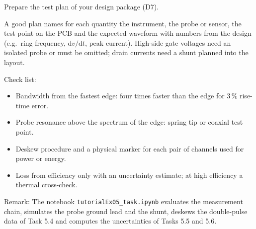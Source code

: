

Prepare the test plan of your design package (D7).


\begin{solutionblock}
	A good plan names for each quantity the instrument, the probe or sensor, the test point on the PCB and the expected waveform with numbers from the design (e.g.\ ring frequency, $\mathrm{d}v/\mathrm{d}t$, peak current). High-side gate voltages need an isolated probe or must be omitted; drain currents need a shunt planned into the layout.
\end{solutionblock}


\begin{solutionblock}
	Check list:
	\begin{itemize}
		\item Bandwidth from the fastest edge: four times faster than the edge for 3\,\% rise-time error.
		\item Probe resonance above the spectrum of the edge: spring tip or coaxial test point.
		\item Deskew procedure and a physical marker for each pair of channels used for power or energy.
		\item Loss from efficiency only with an uncertainty estimate; at high efficiency a thermal cross-check.
	\end{itemize}
\end{solutionblock}

\vspace{0.5cm}
Remark: The notebook \texttt{tutorialEx05\_task.ipynb} evaluates the measurement chain, simulates the probe ground lead and the shunt, deskews the double-pulse data of Task 5.4 and computes the uncertainties of Tasks 5.5 and 5.6.
